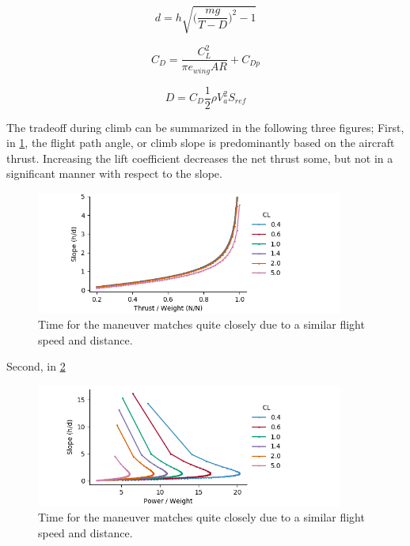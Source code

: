 \documentclass[10pt,english]{article}
\begin{document}
\begin{equation}
\label{e:d}
d = h \sqrt{\bigg(\frac{m g}{T-D}\bigg)^2-1}
\end{equation}

\begin{equation}
\label{e:CD}
C_D = \frac{C_L^2}{\pi e_{wing} AR} + C_{Dp}
\end{equation}

\begin{equation}
\label{e:D}
D = C_D \frac{1}{2} \rho V_a^2 S_{ref}
\end{equation}

The tradeoff during climb can be summarized in the following three figures;  First, in \cref{f:TW_analytical}, the flight path angle, or climb slope is predominantly based on the aircraft thrust.  Increasing the lift coefficient decreases the net thrust some, but not in a significant manner with respect to the slope.

\begin{figure}[H]
\centering
\includegraphics[trim={.0cm 0.0cm .0cm 0cm},clip,width=0.9\textwidth]{TW_analytical}
\vspace{-5pt}
\caption{Time for the maneuver matches quite closely due to a similar flight speed and distance.}
\label{f:TW_analytical}
\end{figure}

Second, in \cref{f:Power_dist_analytical}

\begin{figure}[H]
\centering
\includegraphics[trim={.0cm 0.0cm .0cm 0cm},clip,width=0.9\textwidth]{Power_dist_analytical}
\vspace{-5pt}
\caption{Time for the maneuver matches quite closely due to a similar flight speed and distance.}
\label{f:Power_dist_analytical}
\end{figure}
\end{document}
